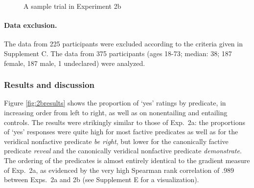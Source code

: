 \documentclass{language}
\newcommand{\6}{\mbox{$[\hspace*{-.6mm}[$}}
\newcommand{\9}{\mbox{$]\hspace*{-.6mm}]$}}
\begin{document}
\begin{figure}[h!]
\begin{center}
\end{center}
\caption{A sample trial in Experiment 2b}\label{fig-trial-exp2b}
\end{figure}


\paragraph{Data exclusion.} The data from 225 participants were excluded according to the criteria given in Supplement C. The data from 375 participants (ages 18-73; median: 38; 187 female, 187 male, 1 undeclared) were analyzed.
    

\subsubsection{Results and discussion}

Figure \ref{fig:2bresults} shows the proportion of `yes' ratings by predicate, in increasing order from left to right, as well as on nonentailing and entailing controls. The results were strikingly similar to those of Exp.~2a: the proportions of `yes' responses were quite high for most factive predicates as well as for the veridical nonfactive predicate {\em be right}, but lower for the canonically factive predicate {\em reveal} and the canonically veridical nonfactive predicate {\em demonstrate}. The ordering of the predicates is almost entirely identical to the gradient measure of Exp.~2a, as evidenced by the very high Spearman rank correlation of .989 between Exps.~2a and 2b (see Supplement E for a visualization). 
 
\end{document}
